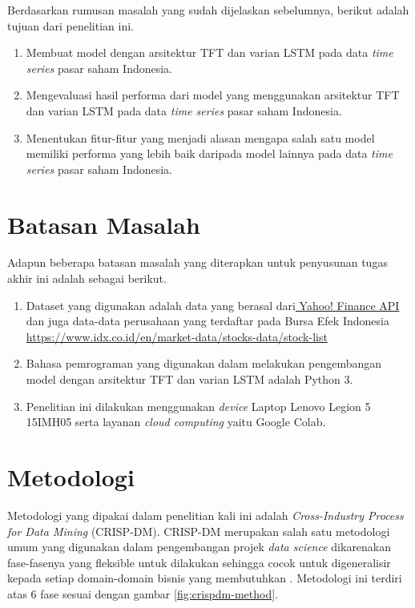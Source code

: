 Berdasarkan rumusan masalah yang sudah dijelaskan sebelumnya, berikut adalah tujuan dari penelitian ini.

\begin{enumerate}
  \item Membuat model dengan arsitektur TFT dan varian LSTM pada data \textit{time series} pasar saham Indonesia.
 \item Mengevaluasi hasil performa dari model yang menggunakan arsitektur TFT dan varian LSTM pada data \textit{time series} pasar saham Indonesia.
  \item Menentukan fitur-fitur yang menjadi alasan mengapa salah satu model memiliki performa yang lebih baik daripada model lainnya pada data \textit{time series} pasar saham Indonesia.
\end{enumerate}

\section{Batasan Masalah}

Adapun beberapa batasan masalah yang diterapkan untuk penyusunan tugas akhir ini adalah sebagai berikut.
\begin{enumerate}
\item Dataset yang digunakan adalah data yang berasal dari\href{https://pypi.org/project/yfinance}{ Yahoo! Finance API } dan juga data-data perusahaan yang terdaftar pada Bursa Efek Indonesia \href{https://www.idx.co.id/en/market-data/stocks-data/stock-list}{https://www.idx.co.id/en/market-data/stocks-data/stock-list} 
\item Bahasa pemrograman yang digunakan dalam melakukan pengembangan model dengan arsitektur TFT dan varian LSTM adalah Python 3.
\item Penelitian ini dilakukan menggunakan \textit{device} Laptop Lenovo Legion 5 15IMH05 serta layanan \textit{cloud computing} yaitu Google Colab. 
\end{enumerate}


\section{Metodologi}

Metodologi yang dipakai dalam penelitian kali ini adalah \textit{Cross-Industry Process for Data Mining} (CRISP-DM). CRISP-DM merupakan salah satu metodologi umum yang digunakan dalam pengembangan projek \textit{data science} dikarenakan fase-fasenya yang fleksible untuk dilakukan sehingga cocok untuk digeneralisir kepada setiap domain-domain bisnis yang membutuhkan \parencite{datasciencecentral2024}. Metodologi ini terdiri atas 6 fase sesuai dengan gambar \ref{fig:crispdm-method}.

